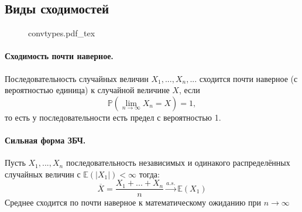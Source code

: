 \documentclass{article}
\newcommand{\E}{\mathbb{E}}
\newcommand{\PP}{\mathbb{P}}
\newcommand{\incfig}[2][1]{%
    \def\svgwidth{#1\columnwidth}
    {#2.pdf_tex}
}
\begin{document}
\subsection{Виды сходимостей}
\begin{figure}[h!]
  \centering
  \incfig{convtypes}
\end{figure}
\paragraph{Сходимость почти наверное.}
Последовательность случайных величин $X_1,...,X_n,...$ сходится почти наверное (с вероятностью единица) к случайной величине $X$, если 
\[
\PP(\lim_{n \rightarrow \infty} X_n = X) = 1,
\]
то есть у последовательности есть предел с вероятностью 1.
\paragraph{Сильная форма ЗБЧ.} Пусть $X_1,...,X_n$ последовательность независимых и одинакого распределённых случайных величин с $\E(|X_1|)<\infty$ тогда:
\[
{\overline X} = \frac{X_1+...+X_n}{n} \xrightarrow{a.s.} \E(X_1)
\]
Среднее сходится по почти наверное к математическому ожиданию при $n \rightarrow \infty$
\end{document}
